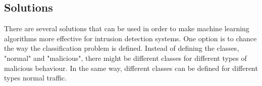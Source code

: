 \subsection{Solutions}
There are several solutions that can be used in order to make machine learning algorithms more effective for intrusion detection systems. One option is to chance the way the classification problem is defined. Instead of defining the classes, "normal" and "malicious", there might be different classes for different types of malicious behaviour. In the same way, different classes can be defined for different types normal traffic. 
